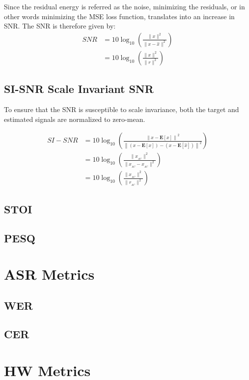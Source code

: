 Since the residual energy is referred as the noise, minimizing the residuals, 
or in other words minimizing the MSE loss function, translates into an increase in SNR.
The SNR is therefore given by:
\begin{align}
    SNR & = 10\log_{10} \left( \frac{ \| x\|^{2}}{\|x - \widehat{x}\|^{2}}  \right) \nonumber \\
    & =  10\log_{10} \left( \frac{ \| x \|^{2}}{\| r \|^{2}} \right)
\end{align}
\subsection{SI-SNR Scale Invariant SNR}
To ensure that the SNR is susceptible to scale invariance,
both the target and estimated signals are normalized to zero-mean.

\begin{align}
    SI-SNR & = 10\log_{10} \left( \frac{\left\| x - \mathbf{E}[x]\right\|^{2}}
    {\left\| (x - \mathbf{E}[x]) - (x - \mathbf{E}[\widehat{x}]) \right\|^{2}} \right) \nonumber \\
    & = 10\log_{10} \left( \frac{ \| x_{_{AC}}\|^{2}}{\|x_{_{AC}} - \widehat{x}_{_{AC}}\|^{2}}  \right) \nonumber \\
    & =  10\log_{10} \left( \frac{ \| x_{_{AC}}\|^{2}}{\| r_{_{AC}} \|^{2}} \right)
\end{align}


\subsection{STOI}
\subsection{PESQ}

\section{ASR Metrics}
\subsection{WER}
\subsection{CER}

\section{HW Metrics}
